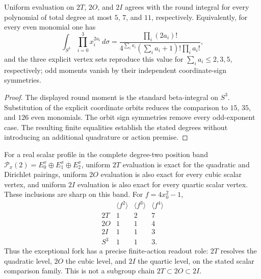 \documentclass[11pt]{article}
\begin{document}
\begin{theorem}
\label{p1:thm:v180-exceptional-scalar-moment-ranges}
Uniform evaluation on $2T$, $2O$, and $2I$ agrees with the round integral
for every polynomial of total degree at most $5$, $7$, and $11$,
respectively.  Equivalently, for every even monomial one has
\[
 \int_{S^3}\prod_{i=0}^{3}x_i^{2a_i}\,d\sigma
 =\frac{\prod_i(2a_i)!}
 {4^{\sum_i a_i}(\sum_i a_i+1)!\prod_i a_i!},
\]
and the three explicit vertex sets reproduce this value for
$\sum_i a_i\le2,3,5$, respectively; odd moments vanish by their independent
coordinate-sign symmetries.
\end{theorem}
\begin{proof}
The displayed round moment is the standard beta-integral on $S^3$.
Substitution of the explicit coordinate orbits reduces the comparison to
$15$, $35$, and $126$ even monomials.  The orbit sign symmetries remove every
odd-exponent case.  The resulting finite equalities establish the stated
degrees without introducing an additional quadrature or action premise.
\end{proof}

\begin{corollary}
\label{p1:cor:v180-exceptional-scalar-action-orders}
For a real scalar profile in the complete degree-two position band
$\mathcal P_x(2)=E_0^x\oplus E_1^x\oplus E_2^x$, uniform $2T$ evaluation is
exact for the quadratic and Dirichlet pairings, uniform $2O$ evaluation is
also exact for every cubic scalar vertex, and uniform $2I$ evaluation is also
exact for every quartic scalar vertex.  These inclusions are sharp on this
band.  For $f=4x_0^2-1$,
\[
\begin{array}{c|ccc}
 &\langle f^2\rangle&\langle f^3\rangle&\langle f^4\rangle\\ \hline
 2T&1&2&7\\
 2O&1&1&4\\
 2I&1&1&3\\
 S^3&1&1&3 .
\end{array}
\]
Thus the exceptional fork has a precise finite-action readout role:
$2T$ resolves the quadratic level, $2O$ the cubic level, and $2I$ the
quartic level, on the stated scalar comparison family.  This is not a subgroup
chain $2T\subset2O\subset2I$.
\end{corollary}
\end{document}
